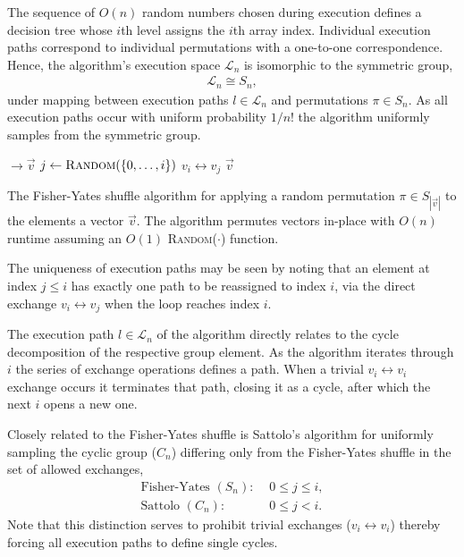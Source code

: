 The sequence of $O(n)$ random numbers chosen during execution defines a decision tree whose $i$th level assigns the $i$th array index. Individual execution paths correspond to individual permutations with a one-to-one correspondence. Hence, the algorithm's execution space $\mathcal{L}_n$ is isomorphic to the symmetric group,
\begin{align}
	\mathcal{L}_n \cong S_n,
\end{align}
under mapping between execution paths \mbox{$l\in\mathcal{L}_n$} and permutations \mbox{$\pi\in S_n$}. As all execution paths occur with uniform probability $1/n!$ the algorithm uniformly samples from the symmetric group.

\begin{algorithm}[H]
	\begin{algorithmic}
		 $\to \vec{v}$ 
		 
		\State $j \gets \textsc{Random}(\{0,\dots,i\})$ 
		\State $v_i\leftrightarrow v_j$ 
		\EndFor
		\State \Return $\vec{v}$
		\EndFunction
	\end{algorithmic}
	\caption{\cite{FisherYates53} The Fisher-Yates shuffle algorithm for applying a random permutation $\pi\in S_{|\vec{v}|}$ to the elements a vector $\vec{v}$. The algorithm permutes  vectors in-place with $O(n)$ runtime assuming an $O(1)$ \textsc{Random}($\cdot$) function.}\label{alg:fisher_yates}
\end{algorithm}

The uniqueness of execution paths may be seen by noting that an element at index $j\leq i$ has  exactly one path to be reassigned to index $i$, via the direct exchange $v_i\leftrightarrow v_j$ when the loop reaches index $i$.

The execution path $l\in\mathcal{L}_n$ of the algorithm directly relates to the cycle decomposition of the respective group element. As the algorithm iterates through $i$ the series of exchange operations defines a path. When a trivial $v_i\leftrightarrow v_i$ exchange occurs it terminates that path, closing it as a cycle, after which the next $i$ opens a new one.

Closely related to the Fisher-Yates shuffle is Sattolo's algorithm \cite{Sattolo86} for uniformly sampling the cyclic group ($C_n$) differing only from the Fisher-Yates shuffle in the set of allowed exchanges,
\begin{align}
	\text{Fisher-Yates }(S_n):\,\, & 0\leq j\leq i,\nonumber \\
	\text{Sattolo }(C_n):\,\,      & 0\leq j<i.
\end{align}
Note that this distinction serves to prohibit trivial exchanges ($v_i\leftrightarrow v_i$) thereby forcing all execution paths to define single cycles.

